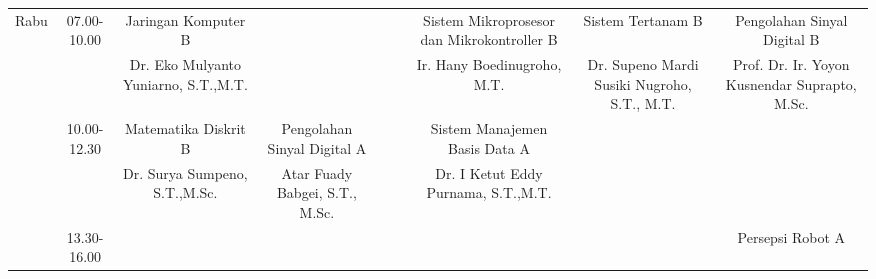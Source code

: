 \begin{table}[]
\begin{tabular}{|c|c|ccccccc|}
  \multirow{6}{*}{Rabu}   & \multirow{2}{*}{07.00-10.00} & \multicolumn{1}{c|}{Jaringan Komputer B}                          & \multicolumn{1}{c|}{}                                              & \multicolumn{1}{c|}{}                                         & \multicolumn{1}{c|}{}                                                & \multicolumn{1}{c|}{Sistem Mikroprosesor   dan Mikrokontroller B} & \multicolumn{1}{c|}{Sistem Tertanam B}                             & Pengolahan Sinyal   Digital B                   \\ \cline{3-9} 
                          &                              & \multicolumn{1}{c|}{Dr. Eko Mulyanto Yuniarno, S.T.,M.T.}         & \multicolumn{1}{c|}{}                                              & \multicolumn{1}{c|}{}                                         & \multicolumn{1}{c|}{}                                                & \multicolumn{1}{c|}{Ir. Hany   Boedinugroho, M.T.}                & \multicolumn{1}{c|}{Dr. Supeno Mardi   Susiki Nugroho, S.T., M.T.} & Prof. Dr. Ir. Yoyon   Kusnendar Suprapto, M.Sc. \\ \cline{2-9} 
                          & \multirow{2}{*}{10.00-12.30} & \multicolumn{1}{c|}{Matematika Diskrit B}                         & \multicolumn{1}{c|}{Pengolahan Sinyal   Digital A}                 & \multicolumn{1}{c|}{}                                         & \multicolumn{1}{c|}{}                                                & \multicolumn{1}{c|}{Sistem Manajemen   Basis Data A}              & \multicolumn{1}{c|}{}                                              &                                                 \\ \cline{3-9} 
                          &                              & \multicolumn{1}{c|}{Dr. Surya Sumpeno, S.T.,M.Sc.}                & \multicolumn{1}{c|}{Atar Fuady Babgei,   S.T., M.Sc.}              & \multicolumn{1}{c|}{}                                         & \multicolumn{1}{c|}{}                                                & \multicolumn{1}{c|}{Dr. I Ketut Eddy   Purnama, S.T.,M.T.}        & \multicolumn{1}{c|}{}                                              &                                                 \\ \cline{2-9} 
                          & \multirow{2}{*}{13.30-16.00} & \multicolumn{1}{c|}{}                                             & \multicolumn{1}{c|}{}                                              & \multicolumn{1}{c|}{}                                         & \multicolumn{1}{c|}{}                                                & \multicolumn{1}{c|}{}                                             & \multicolumn{1}{c|}{}                                              & Persepsi Robot A                                \\ \cline{3-9} 

\end{tabular}
\end{table}
